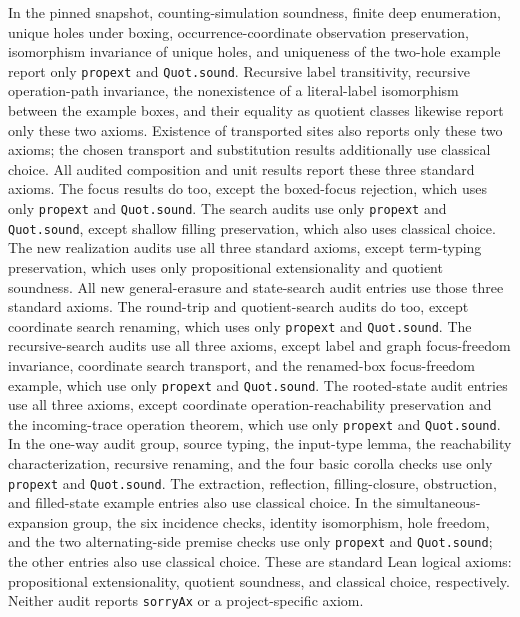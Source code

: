 In the pinned snapshot, counting-simulation soundness, finite deep enumeration,
unique holes under boxing, occurrence-coordinate observation preservation,
isomorphism invariance of unique holes, and uniqueness of the two-hole example
report only \texttt{propext} and \texttt{Quot.sound}.
Recursive label transitivity, recursive operation-path invariance, the
nonexistence of a literal-label isomorphism between the example boxes, and their
equality as quotient classes likewise report only these two axioms. Existence
of transported sites also reports only these two axioms; the chosen transport
and substitution results additionally use classical choice.
All audited composition and unit results report these three standard
axioms. The focus results do too, except the boxed-focus rejection, which uses
only \texttt{propext} and \texttt{Quot.sound}. The search audits use only \texttt{propext} and \texttt{Quot.sound}, except
shallow filling preservation, which also uses classical choice. The new realization audits use all three standard axioms, except term-typing
preservation, which uses only propositional extensionality and quotient soundness.
All new general-erasure and state-search audit entries use those three
standard axioms. The round-trip and quotient-search audits do too, except
coordinate search renaming, which uses only \texttt{propext} and
\texttt{Quot.sound}.
The recursive-search audits use all three axioms, except label and graph
focus-freedom invariance, coordinate search transport, and the renamed-box
focus-freedom example, which use only \texttt{propext} and \texttt{Quot.sound}.
The rooted-state audit entries use all three axioms, except coordinate
operation-reachability preservation and the incoming-trace operation theorem,
which use only \texttt{propext} and \texttt{Quot.sound}.
In the one-way audit group, source typing, the input-type lemma, the
reachability characterization, recursive renaming, and the four basic corolla
checks use only \texttt{propext} and \texttt{Quot.sound}. The extraction,
reflection, filling-closure, obstruction, and filled-state example entries
also use classical choice.
In the simultaneous-expansion group, the six incidence checks, identity
isomorphism, hole freedom, and the two alternating-side premise checks use
only \texttt{propext} and \texttt{Quot.sound}; the other entries also use
classical choice.
These are standard Lean logical axioms: propositional extensionality, quotient
soundness, and classical choice, respectively. Neither audit reports
\texttt{sorryAx} or a project-specific axiom.

